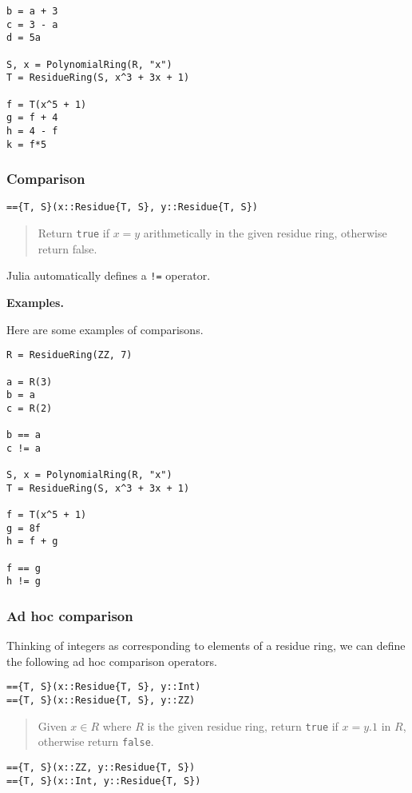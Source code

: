 \documentclass[a4paper,10pt]{article}
\newcommand{\code}{\lstinline}
\newcommand{\desc}[1]{\vspace{-3mm}\begin{quote}#1\end{quote}}
\begin{document}
{{{\begin{lstlisting}
b = a + 3
c = 3 - a
d = 5a

S, x = PolynomialRing(R, "x")
T = ResidueRing(S, x^3 + 3x + 1)

f = T(x^5 + 1)
g = f + 4
h = 4 - f
k = f*5
\end{lstlisting}

\subsubsection{Comparison}

\begin{lstlisting}
=={T, S}(x::Residue{T, S}, y::Residue{T, S})
\end{lstlisting}

\desc{Return \code{true} if $x = y$ arithmetically in the given residue ring, 
otherwise return false.}

Julia automatically defines a \code{!=} operator.

\textbf{Examples.}

Here are some examples of comparisons.

\begin{lstlisting}
R = ResidueRing(ZZ, 7)

a = R(3)
b = a
c = R(2)

b == a
c != a

S, x = PolynomialRing(R, "x")
T = ResidueRing(S, x^3 + 3x + 1)

f = T(x^5 + 1)
g = 8f
h = f + g

f == g
h != g
\end{lstlisting}

\subsubsection{Ad hoc comparison}

Thinking of integers as corresponding to elements of a residue ring, we
can define the following ad hoc comparison operators.

\begin{lstlisting}
=={T, S}(x::Residue{T, S}, y::Int)
=={T, S}(x::Residue{T, S}, y::ZZ)
\end{lstlisting}

\desc{Given $x \in R$ where $R$ is the given residue ring, return \code{true} 
if $x = y.1$ in $R$, otherwise return \code{false}.}

\begin{lstlisting}
=={T, S}(x::ZZ, y::Residue{T, S})
=={T, S}(x::Int, y::Residue{T, S})
\end{lstlisting}

}}}
\end{document}
